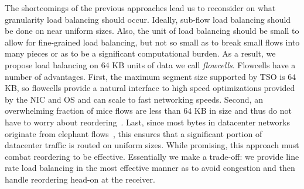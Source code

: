 The shortcomings of the previous approaches lead us to reconsider on what granularity
load balancing should occur. 
Ideally, sub-flow load balancing should be done on near uniform sizes.
Also, the unit of load balancing should be small to
allow for fine-grained load balancing, but not so small as to break small flows into 
many pieces or as to be a significant computational burden. As a result, we
propose load balancing on 64 KB units of data we call {\em flowcells}. Flowcells
have a number of advantages. First, the maximum segment size supported by TSO
is 64 KB, so flowcells provide a natural interface to high speed optimizations provided
by the NIC and OS and can scale to fast networking speeds. Second, an overwhelming fraction of mice flows are less than 64 KB in size
 and thus do not have to worry about reordering~\cite{benson10,vl2,kandula2009nature}.
Last, since most bytes in datacenter networks originate from elephant flows~\cite{kandula2009nature,benson10,dctcp},
this ensures that a significant portion of datacenter traffic is routed on uniform
sizes. While promising, this approach must combat reordering to be effective. 
Essentially we make a trade-off: we provide line rate load balancing in the most effective
manner as to avoid congestion and then handle reordering head-on at the receiver.

